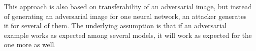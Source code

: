 This approach is also based on transferability of an adversarial image, but instead of generating an adversarial image for one neural network, an attacker generates it for several of them. The underlying assumption is that if an adversarial example works as expected among several models, it will work as expected for the one more as well. 

